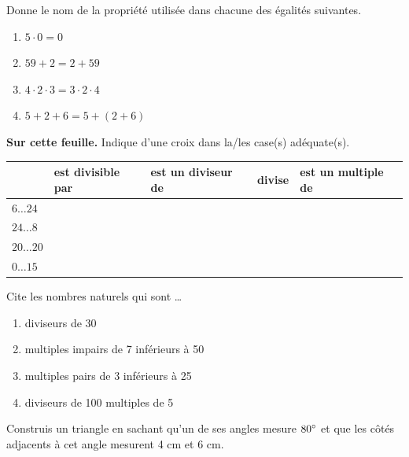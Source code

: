 \documentclass[12pt,parskip=half-, twoside=semi]{scrartcl}
\begin{document}
\newpage
\begin{exercise}
    Donne le nom de la propriété utilisée dans chacune des égalités suivantes. 
    \begin{enumerate}[cols=2]
        \item $5 \cdot 0 = 0$ 
        \item $59 + 2= 2 + 59$ 
        \item $4 \cdot 2 \cdot 3 = 3\cdot 2 \cdot 4$ 
        \item $5 + 2 + 6 = 5 + \left(2+6\right)$ 
    \end{enumerate}
\end{exercise}

\begin{exercise}
    \textbf{Sur cette feuille.} Indique d'une croix dans la/les case(s) adéquate(s).\\
    {\renewcommand{\arraystretch}{1.4}
    \begin{tabularx}{\linewidth}{|p{1.5cm}|Y|Y|Y|Y|}
        \hline
        & est divisible par & est un diviseur de & divise & est un multiple de \\
        \hline
        $6 \dots 24$ & & & &\\
        \hline
        $24 \dots 8$ & & & &\\
        \hline
        $20 \dots 20$ & & & & \\
        \hline
        $0 \dots 15$ & & & & \\
        \hline
    \end{tabularx}}
\end{exercise}

\begin{exercise}
    Cite les nombres naturels qui sont \dots
    \begin{enumerate}[cols=2]
        \item diviseurs de 30
        \item multiples impairs de 7 inférieurs à 50
        \item multiples pairs de 3 inférieurs à 25
        \item diviseurs de 100 multiples de 5
    \end{enumerate}
\end{exercise}

\begin{exercise}
    Construis un triangle en sachant qu'un de ses angles mesure $80\degree$ et que les côtés adjacents à cet angle mesurent 4 cm et 6 cm.
\end{exercise}
\end{document}
